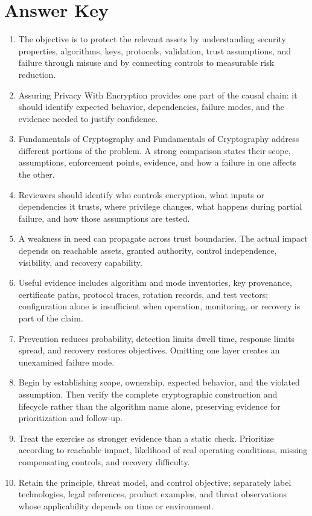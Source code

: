 \documentclass[11pt,letterpaper]{article}
\begin{document}
\section*{Answer Key}
\begin{enumerate}
\item The objective is to protect the relevant assets by understanding security properties, algorithms, keys, protocols, validation, trust assumptions, and failure through misuse and by connecting controls to measurable risk reduction.
\item Assuring Privacy With Encryption provides one part of the causal chain: it should identify expected behavior, dependencies, failure modes, and the evidence needed to justify confidence.
\item Fundamentals of Cryptography and Fundamentals of Cryptography address different portions of the problem. A strong comparison states their scope, assumptions, enforcement points, evidence, and how a failure in one affects the other.
\item Reviewers should identify who controls encryption, what inputs or dependencies it trusts, where privilege changes, what happens during partial failure, and how those assumptions are tested.
\item A weakness in need can propagate across trust boundaries. The actual impact depends on reachable assets, granted authority, control independence, visibility, and recovery capability.
\item Useful evidence includes algorithm and mode inventories, key provenance, certificate paths, protocol traces, rotation records, and test vectors; configuration alone is insufficient when operation, monitoring, or recovery is part of the claim.
\item Prevention reduces probability, detection limits dwell time, response limits spread, and recovery restores objectives. Omitting one layer creates an unexamined failure mode.
\item Begin by establishing scope, ownership, expected behavior, and the violated assumption. Then verify the complete cryptographic construction and lifecycle rather than the algorithm name alone, preserving evidence for prioritization and follow-up.
\item Treat the exercise as stronger evidence than a static check. Prioritize according to reachable impact, likelihood of real operating conditions, missing compensating controls, and recovery difficulty.
\item Retain the principle, threat model, and control objective; separately label technologies, legal references, product examples, and threat observations whose applicability depends on time or environment.
\end{enumerate}
\end{document}
